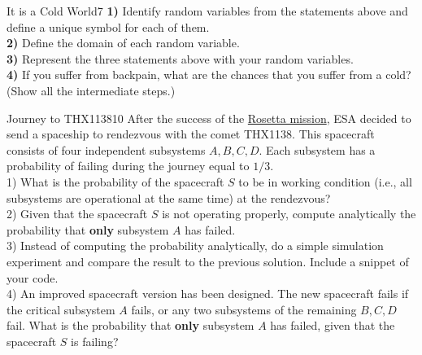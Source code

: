 \begin{questions}
\begin{question}{It is a Cold World}{7}
\textbf{1)} Identify random variables from the statements above and define a unique symbol for each of them.\\
\textbf{2)} Define the domain of each random variable.\\
\textbf{3)} Represent the three statements above with your random variables.\\
\textbf{4)} If you suffer from backpain, what are the chances that you suffer from a cold? (Show all the intermediate steps.)

\begin{answer}\end{answer}

\end{question}



\begin{question}{Journey to THX1138}{10}
	After the success of the \href{http://rosetta.esa.int/}{Rosetta mission}, ESA decided to send a spaceship to rendezvous with the comet THX1138. 
	This spacecraft consists of four independent subsystems $A,B,C,D$. 
	Each subsystem has a probability of failing during the journey equal to $1/3$. 
	\\
	1) What is the probability of the spacecraft $S$ to be in working condition (i.e., all subsystems are operational at the same time) at the rendezvous?
	\\
	2) Given that the spacecraft $S$ is not operating properly, compute	analytically the probability that \textbf{only} subsystem $A$ has failed. 
	\\
	3) Instead of computing the probability analytically, do a simple simulation experiment and compare the result to the previous solution. 
	Include a snippet of your code. 
	\\
	4) An improved spacecraft version has been designed.
	The new spacecraft fails if the critical subsystem $A$ fails, or any two subsystems of the remaining $B,C,D$ fail. 
	What is the probability that \textbf{only} subsystem $A$ has failed, given that the spacecraft $S$ is failing? 
	
	
\begin{answer}\end{answer}
	
\end{question}


\end{questions}

